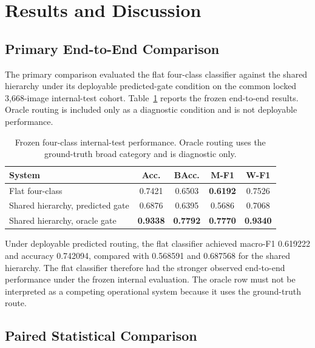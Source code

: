 \section{Results and Discussion}
\label{sec:results_discussion}

\subsection{Primary End-to-End Comparison}

The primary comparison evaluated the flat four-class classifier against the
shared hierarchy under its deployable predicted-gate condition on the common
locked 3,668-image internal-test cohort. Table~\ref{tab:primary_results}
reports the frozen end-to-end results. Oracle routing is included only as a
diagnostic condition and is not deployable performance.

\begin{table}[t]
    \centering
    \caption{Frozen four-class internal-test performance. Oracle routing uses
    the ground-truth broad category and is diagnostic only.}
    \label{tab:primary_results}
    \footnotesize
    \setlength{\tabcolsep}{2.2pt}
    \begin{tabular}{lcccc}
        \toprule
        System & Acc. & BAcc. & M-F1 & W-F1 \\
        \midrule
        Flat four-class
        & 0.7421 & 0.6503 & \textbf{0.6192} & 0.7526 \\
        Shared hierarchy, predicted gate
        & 0.6876 & 0.6395 & 0.5686 & 0.7068 \\
        Shared hierarchy, oracle gate
        & \textbf{0.9338} & \textbf{0.7792} & \textbf{0.7770} & \textbf{0.9340} \\
        \bottomrule
    \end{tabular}
\end{table}

Under deployable predicted routing, the flat classifier achieved macro-F1
0.619222 and accuracy 0.742094, compared with 0.568591 and 0.687568 for the
shared hierarchy. The flat classifier therefore had the stronger observed
end-to-end performance under the frozen internal evaluation. The oracle row
must not be interpreted as a competing operational system because it uses the
ground-truth route.

\subsection{Paired Statistical Comparison}

